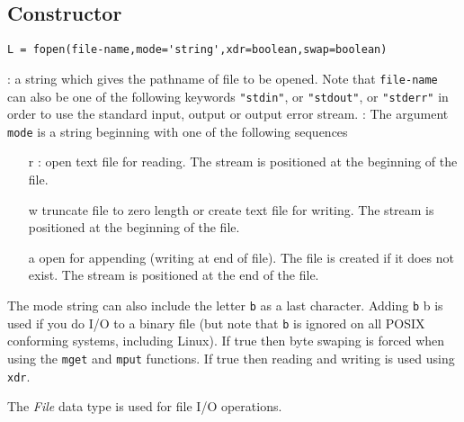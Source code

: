 
\begin{mandesc}
\end{mandesc}

\subsection*{Constructor}
\begin{verbatim}
L = fopen(file-name,mode='string',xdr=boolean,swap=boolean)
\end{verbatim}
\begin{parameters}
  \begin{varlist}
    : a string which gives the pathname of file to be opened. 
    Note that \verb+file-name+ can also be one of the following keywords \verb+"stdin"+, or 
    \verb+"stdout"+, or \verb+"stderr"+ in order to use the standard input, output or output error 
    stream.
    : The argument \verb+mode+ is a string beginning  with  one  of  the  following  sequences
    \begin{itemize}
      \item[r]: open text file for reading. The stream is positioned at the beginning of the
        file.
      \item[w] truncate  file  to  zero  length  or create text file for writing.  The stream is
        positioned at the beginning of the file.
      \item[a] open for appending (writing at end of file).  The file is created if it does not 
	exist.  The stream is positioned at the end of the file.
    \end{itemize}
    The mode string can also include the letter \verb+b+ as a last character. 
    Adding \verb+b+ b is used if you do I/O to a binary file 
    (but note that \verb+b+ is ignored on all POSIX conforming systems, including Linux).
     If true then byte swaping is forced when using the \verb+mget+ and 
    \verb+mput+ functions. 
     If true then reading and writing is used using \verb+xdr+.
  \end{varlist}
\end{parameters}

\begin{mandescription}
The \emph{File} data type is used for file I/O operations.
\end{mandescription}

